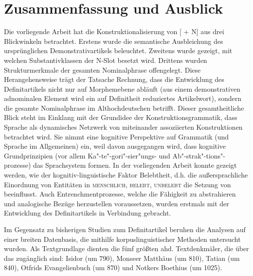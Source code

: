 \chapter{Zusammenfassung und Ausblick}

Die vorliegende Arbeit hat die Konstruktionalisierung von [ + N] aus drei Blickwinkeln betrachtet. Erstens wurde die semantische Ausbleichung des ursprünglichen Demonstrativartikels beleuchtet. Zweitens wurde gezeigt, mit welchen Substantivklassen der N-Slot besetzt wird. Drittens wurden Strukturmerkmale der gesamten Nominalphrase offengelegt. 
Diese Herangehensweise trägt der Tatsache Rechnung, dass die Entwicklung des Definitartikels nicht nur auf Morphemebene abläuft (aus einem demonstrativen adnominalen Element wird ein auf Definitheit reduziertes Artikelwort), sondern die gesamte Nominalphrase im Althochdeutschen betrifft. Dieser gesamtheitliche Blick steht im Einklang mit der Grundidee der Konstruktionsgrammatik, dass Sprache als dynamisches Netzwerk von miteinander assoziierten Konstruktionen betrachtet wird. Sie nimmt eine kognitive Perspektive auf Grammatik (und Sprache im Allgemeinen) ein, weil davon ausgegangen wird, dass kognitive Grundprinzipien (vor allem Ka"-te"-gori"-sier"ungs- und Ab"-strak"-tions"-prozesse) das Sprachsystem formen. In der vorliegenden Arbeit konnte gezeigt werden, wie der kognitiv-linguistische Faktor Belebtheit, d.h. die außersprachliche Einordnung von Entitäten in \textsc{menschlich, belebt, unbelebt} die Setzung von  beeinflusst. Auch Entrenchmentprozesse, welche die Fähigkeit zu abstrahieren und analogische Bezüge herzustellen voraussetzen, wurden erstmals mit der Entwicklung des Definitartikels in Verbindung gebracht.

Im Gegensatz zu bisherigen Studien zum Definitartikel beruhen die Analysen auf einer breiten Datenbasis, die mithilfe korpuslinguistischer Methoden untersucht wurden. Als Textgrundlage dienten die fünf größten ahd. Textdenkmäler, die über das  zugänglich sind: Isidor (um 790), Monseer Matthäus (um 810), Tatian (um 840), Otfrids Evangelienbuch (um 870) und Notkers Boethius (um 1025). 

